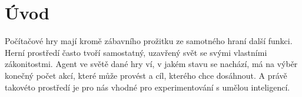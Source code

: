 \chapter*{Úvod}


Počítačové hry mají kromě zábavního prožitku ze samotného hraní další funkci.
Herní prostředí často tvoří samostatný, uzavřený svět se svými vlastními zákonitostmi.
Agent ve světě dané hry ví, v jakém stavu se nachází, má na výběr konečný počet akcí, které může provést
a cíl, kterého chce dosáhnout. A právě takovéto prostředí je pro nás vhodné pro experimentování s umělou inteligencí. 
